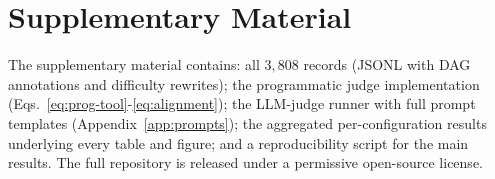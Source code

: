 \section*{Supplementary Material}
\label{sec:release}

The supplementary material contains: all $3{,}808$ records (JSONL with DAG annotations and difficulty rewrites); the programmatic judge implementation (Eqs.~\ref{eq:prog-tool}-\ref{eq:alignment}); the LLM-judge runner with full prompt templates (Appendix~\ref{app:prompts}); the aggregated per-configuration results underlying every table and figure; and a reproducibility script for the main results. The full repository is released under a permissive open-source license.